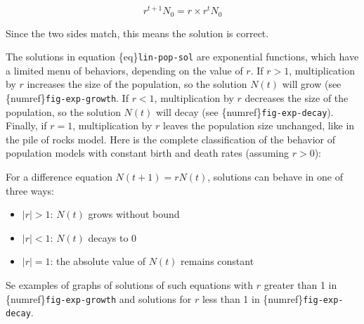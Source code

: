 \documentclass[
  letterpaper,
  DIV=11,
  numbers=noendperiod]{scrreprt}
\begin{document}
\[
r^{t+1} N_0 = r \times r^t N_0
\]

Since the two sides match, this means the solution is correct.

The solutions in equation \{eq\}\texttt{lin-pop-sol} are exponential
functions, which have a limited menu of behaviors, depending on the
value of \(r\). If \(r > 1\), multiplication by \(r\) increases the size
of the population, so the solution \(N(t)\) will grow (see
\{numref\}\texttt{fig-exp-growth}. If \(r < 1\), multiplication by \(r\)
decreases the size of the population, so the solution \(N(t)\) will
decay (see \{numref\}\texttt{fig-exp-decay}). Finally, if \(r=1\),
multiplication by \(r\) leaves the population size unchanged, like in
the pile of rocks model. Here is the complete classification of the
behavior of population models with constant birth and death rates
(assuming \(r>0\)):

\begin{tcolorbox}[enhanced jigsaw, colbacktitle=quarto-callout-tip-color!10!white, leftrule=.75mm, coltitle=black, left=2mm, breakable, opacityback=0, colback=white, toprule=.15mm, opacitybacktitle=0.6, bottomtitle=1mm, colframe=quarto-callout-tip-color-frame, rightrule=.15mm, bottomrule=.15mm, toptitle=1mm, titlerule=0mm, arc=.35mm, title={Classification of solutions of linear dynamic models}]

For a difference equation \(N(t+1) = rN(t)\), solutions can behave in
one of three ways:

\begin{itemize}
\item
  \(|r| > 1\): \(N(t)\) grows without bound
\item
  \(|r| < 1\): \(N(t)\) decays to 0
\item
  \(|r| = 1\): the absolute value of \(N(t)\) remains constant
\end{itemize}

\end{tcolorbox}

Se examples of graphs of solutions of such equations with \(r\) greater
than 1 in \{numref\}\texttt{fig-exp-growth} and solutions for \(r\) less
than 1 in \{numref\}\texttt{fig-exp-decay}.
\end{document}
